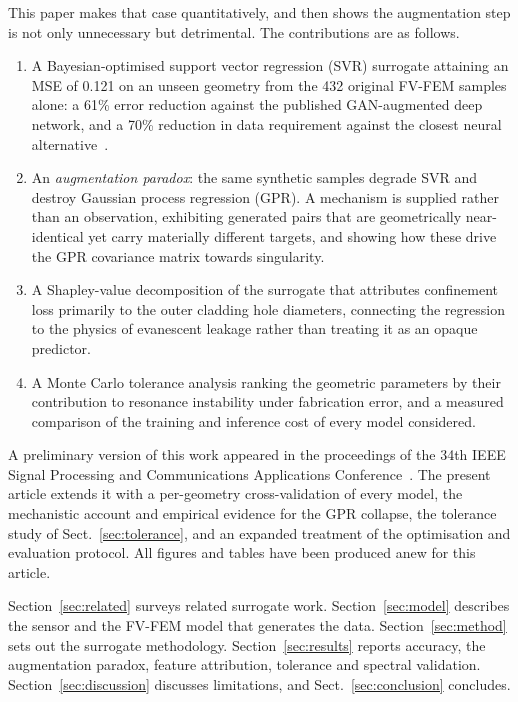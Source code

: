\documentclass[iicol,pdflatex,sn-basic,Numbered]{sn-jnl}
\begin{document}
This paper makes that case quantitatively, and then shows the augmentation step
is not only unnecessary but detrimental. The contributions are as follows.

\begin{enumerate}
\item A Bayesian-optimised support vector regression (SVR) surrogate attaining an
MSE of 0.121 on an unseen geometry from the 432 original FV-FEM samples alone: a
61\% error reduction against the published GAN-augmented deep network, and a
70\% reduction in data requirement against the closest neural
alternative~\cite{ehyaee2024}.
\item An \emph{augmentation paradox}: the same synthetic samples degrade SVR and
destroy Gaussian process regression (GPR). A mechanism is supplied rather than an
observation, exhibiting generated pairs that are geometrically near-identical yet
carry materially different targets, and showing how these drive the GPR
covariance matrix towards singularity.
\item A Shapley-value decomposition of the surrogate that attributes confinement
loss primarily to the outer cladding hole diameters, connecting the regression to
the physics of evanescent leakage rather than treating it as an opaque
predictor.
\item A Monte Carlo tolerance analysis ranking the geometric parameters by their
contribution to resonance instability under fabrication error, and a measured
comparison of the training and inference cost of every model considered.
\end{enumerate}

A preliminary version of this work appeared in the proceedings of the 34th IEEE
Signal Processing and Communications Applications Conference~\cite{hammoud2026siu}.
The present article extends it with a per-geometry cross-validation of every
model, the mechanistic account and empirical evidence for the GPR collapse, the
tolerance study of Sect.~\ref{sec:tolerance}, and an expanded treatment of the
optimisation and evaluation protocol. All figures and tables have been produced
anew for this article.

Section~\ref{sec:related} surveys related surrogate work.
Section~\ref{sec:model} describes the sensor and the FV-FEM model that generates
the data. Section~\ref{sec:method} sets out the surrogate methodology.
Section~\ref{sec:results} reports accuracy, the augmentation paradox, feature
attribution, tolerance and spectral validation. Section~\ref{sec:discussion}
discusses limitations, and Sect.~\ref{sec:conclusion} concludes.
\end{document}
